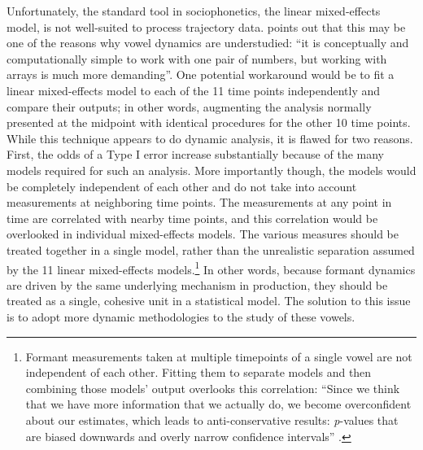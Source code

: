 Unfortunately, the standard tool in sociophonetics, the linear mixed-effects model, is not well-suited to process trajectory data. \citet[62]{ash_2003} points out that this may be one of the reasons why vowel dynamics are understudied: ``it is conceptually and computationally simple to work with one pair of numbers, but working with arrays is much more demanding''. One potential workaround would be to fit a linear mixed-effects model to each of the 11 time points independently and compare their outputs; in other words, augmenting the analysis normally presented at the midpoint with identical procedures for the other 10 time points. While this technique appears to do dynamic analysis, it is flawed for two reasons. First, the odds of a Type I error increase substantially because of the many models required for such an analysis. More importantly though, the models would be completely independent of each other and do not take into account measurements at neighboring time points. The measurements at any point in time are correlated with nearby time points, and this correlation would be overlooked in individual mixed-effects models. The various measures should be treated together in a single model, rather than the unrealistic separation assumed by the 11 linear mixed-effects models.\footnote{Formant measurements taken at multiple timepoints of a single vowel are not independent of each other. Fitting them to separate models and then combining those models' output overlooks this correlation: ``Since we think that we have more information that we actually do, we become overconfident about our estimates, which leads to anti-conservative results: \textit{p}-values that are biased downwards and overly narrow confidence intervals'' \citep[13]{soskuthy_2017}.} In other words, because formant dynamics are driven by the same underlying mechanism in production, they should be treated as a single, cohesive unit in a statistical model. The solution to this issue is to adopt more dynamic methodologies to the study of these vowels.

